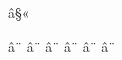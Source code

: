 \mubyte \blacklozenge ^^e2^^a7^^ab\endmubyte %

\mubyte \bigodot ^^e2^^a8^^80\endmubyte %
\mubyte \bigoplus ^^e2^^a8^^81\endmubyte %
\mubyte \bigotimes ^^e2^^a8^^82\endmubyte %
\mubyte \biguplus ^^e2^^a8^^84\endmubyte %
\mubyte \bigsqcap ^^e2^^a8^^85\endmubyte %
\mubyte \bigsqcup ^^e2^^a8^^86\endmubyte %

\endinput
